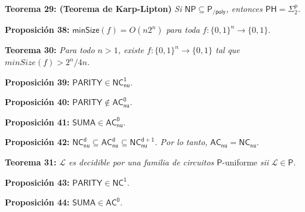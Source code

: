 \documentclass{article}
\begin{document}
\begin{flushleft}
  \textbf{Teorema 29: \hypertarget{karpLipton}{\textcolor{Bittersweet}{(Teorema de Karp-Lipton)}}}
  \textit{Si $\mathsf{NP \subseteq P_{/poly}}$, entonces $\mathsf{PH} = \Sigma^p_2$.}
\end{flushleft}

\begin{flushleft}
  \textbf{Proposición 38:}
  $\mathsf{minSize}(f) = O(n2^n)$ \textit{para toda} $f : \{0,1\}^n \rightarrow \{0,1\}$.
\end{flushleft}

\begin{flushleft}
  \textbf{Teorema 30:}
  \textit{Para todo $n > 1$, existe $f : \{0,1\}^n \rightarrow \{0,1\}$ tal que $minSize(f) > 2^n / 4n$.}
\end{flushleft}

\begin{flushleft}
  \textbf{Proposición 39:}
  $\mathsf{PARITY \in NC^1_{nu}}$.
\end{flushleft}

\begin{flushleft}
  \textbf{Proposición 40:}
  $\mathsf{PARITY \not\in AC^0_{nu}}$.
\end{flushleft}

\begin{flushleft}
  \textbf{Proposición 41:}
  $\mathsf{SUMA \in AC^0_{nu}}$.
\end{flushleft}

\begin{flushleft}
  \textbf{Proposición 42:}
  $\mathsf{NC^d_{nu} \subseteq AC^d_{nu} \subseteq NC^{d+1}_{nu}}$\textit{. Por lo tanto,} $\mathsf{AC_{nu} = 
  NC_{nu}}$.
\end{flushleft}

\begin{flushleft}
  \textbf{\hypertarget{teo31}{Teorema 31:}}
  \textit{$\mathcal{L}$ es decidible por una familia de circuitos $\mathsf{P}$}-uniforme \textit{sii} $
  \mathcal{L} \in \mathsf{P}$.
\end{flushleft}

\begin{flushleft}
  \textbf{Proposición 43:}
  $\mathsf{PARITY \in NC^1}$.
\end{flushleft}

\begin{flushleft}
  \textbf{Proposición 44:}
  $\mathsf{SUMA \in AC^0}$.
\end{flushleft}
\end{document}
